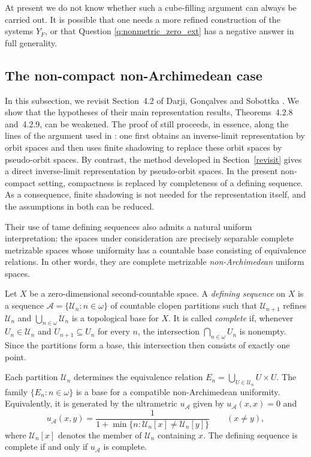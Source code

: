 \documentclass[10pt,a4paper]{amsart}
\numberwithin{equation}{section}
\begin{document}
At present we do not know whether such a cube-filling argument can always be
carried out. It is possible that one needs a more refined construction of the
systems $Y_F$, or that Question \ref{q:nonmetric_zero_ext} has a negative
answer in full generality.

\subsection{The non-compact non-Archimedean case}
\label{subsec:nonarch}

In this subsection, we revisit Section~4.2 of Darji, Gon\c{c}alves and
Sobottka \cite{Darji}. We show that the hypotheses of their main
representation results, Theorems~4.2.8 and~4.2.9, can be weakened.
The proof of \cite[Theorem~4.2.8]{Darji} still proceeds, in essence, along
the lines of the argument used in \cite[Theorem~18]{GM}: one first obtains
an inverse-limit representation by orbit spaces and then uses finite
shadowing to replace these orbit spaces by pseudo-orbit spaces. By contrast,
the method developed in Section~\ref{revisit} gives a direct inverse-limit
representation by pseudo-orbit spaces. In the present non-compact setting,
compactness is replaced by completeness of a defining sequence. As a
consequence, finite shadowing is not needed for the representation itself,
and the assumptions in both \cite[Theorems~4.2.8 and~4.2.9]{Darji} can be
reduced.

Their use of tame defining sequences also admits a natural uniform
interpretation: the spaces under consideration are precisely separable
complete metrizable spaces whose uniformity has a countable base consisting
of equivalence relations. In other words, they are complete metrizable
\emph{non-Archimedean} uniform spaces.

 Let
$X$ be a zero-dimensional second-countable space. A \emph{defining sequence}
on $X$ is a sequence $\mathcal A=\{\mathcal U_n:n\in\omega\}$ of countable
clopen partitions such that $\mathcal U_{n+1}$ refines $\mathcal U_n$ and
$\bigcup_{n\in\omega}\mathcal U_n$ is a topological base for $X$. It is called
\emph{complete} if, whenever $U_n\in\mathcal U_n$ and
$U_{n+1}\subseteq U_n$ for every $n$, the intersection
$\bigcap_{n\in\omega}U_n$ is nonempty. Since the partitions form a base,
this intersection then consists of exactly one point.

Each partition $\mathcal U_n$ determines the equivalence relation
$E_n=\bigcup_{U\in\mathcal U_n}U\times U$. The family $\{E_n:n\in\omega\}$
is a base for a compatible non-Archimedean uniformity. Equivalently, it is
generated by the ultrametric $u_{\mathcal A}$ given by
$u_{\mathcal A}(x,x)=0$ and
\[
u_{\mathcal A}(x,y)
=
\frac{1}{1+\min\{n:\mathcal U_n[x]\neq\mathcal U_n[y]\}}
\qquad (x\neq y),
\]
where $\mathcal U_n[x]$ denotes the member of $\mathcal U_n$ containing
$x$. The defining sequence is complete if and only if
$u_{\mathcal A}$ is complete.
\end{document}
